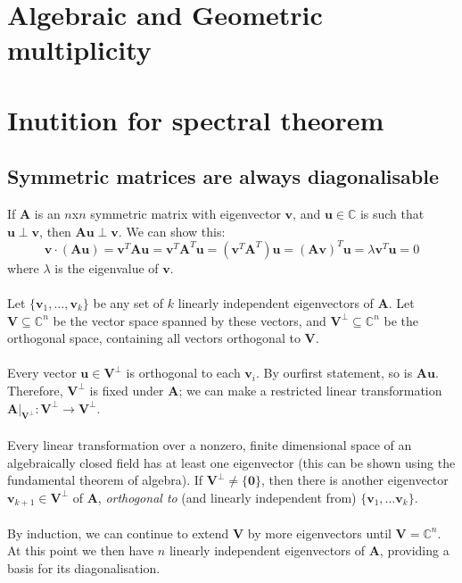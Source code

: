 \documentclass{report}
\begin{document}
\section{Algebraic and Geometric multiplicity}

\newpage

\section{Inutition for spectral theorem}
\subsection{Symmetric matrices are always diagonalisable}
If $\bm A$ is an $n$x$n$ symmetric matrix with eigenvector $\bm v$, and $\bm u\in\mathbb{C}$ is such that $\bm u\perp\bm v$, then 
$\bm{Au}\perp\bm v$. We can show this:
\begin{equation*}
\bm v\cdot(\bm{Au})=\bm v^T\bm{Au}=\bm v^T\bm A^T\bm u=(\bm v^T\bm A^T)\bm u=(\bm A\bm v)^T\bm u
=\lambda\bm v^T\bm u=0
\end{equation*}
where $\lambda$ is the eigenvalue of $\bm v$.\\
\vspace{1mm}\\
Let $\{\bm v_1,\ldots,\bm v_k\}$ be any set of $k$ linearly independent eigenvectors of $\bm A$. Let $\bm V\subseteq\mathbb C^n$ be the vector
space spanned by these vectors, and $\bm V^\perp\subseteq\mathbb C^n$ be the orthogonal space, containing all vectors orthogonal to $\bm V$.\\
\vspace{1mm}\\
Every vector $\bm u\in\bm V^\perp$ is orthogonal to each $\bm v_i$. By ourfirst statement, so is $\bm{Au}$. Therefore, $\bm V^\perp$ is fixed under
$\bm A$; we can make a restricted linear transformation $\bm A|_{\bm V^\perp}:\bm V^\perp\to\bm V^\perp$.\\
\vspace{1mm}\\
Every linear transformation over a nonzero, finite dimensional space of an algebraically closed field has at least one eigenvector (this can be 
shown using the fundamental theorem of algebra). If $\bm V^\perp\neq\{\bm 0\}$, then there is another eigenvector $\bm v_{k+1}\in\bm V^\perp$ of
$\bm A$, \textit{orthogonal to} (and linearly independent from) $\{\bm v_1,\ldots\bm v_k\}$.\\
\vspace{1mm}\\
By induction, we can continue to extend $\bm V$ by more eigenvectors until $\bm V=\mathbb C^n$. At this point we then have
$n$ linearly independent eigenvectors of $\bm A$, providing a basis for its diagonalisation.
\newpage
\end{document}
